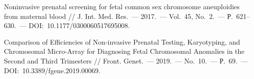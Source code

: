 \begin{thebibliography}{99}
\bibitem{} Noninvasive prenatal screening for fetal common sex chromosome aneuploidies from maternal blood // J. Int. Med. Res.~--- 2017.~--- Vol.~45, No.~2.~--- Р.~621--630.~--- DOI:~10.1177/0300060517695008.

\bibitem{} Comparison of Efficiencies of Non-invasive Prenatal Testing, Karyotyping, and Chromosomal Micro-Array for Diagnosing Fetal Chromosomal Anomalies in the Second and Third Trimesters // Front. Genet.~--- 2019.~--- No.~10.~--- Р.~69.~--- DOI:~10.3389/fgene.2019.00069.
\end{thebibliography}
\thispagestyle{empty}
